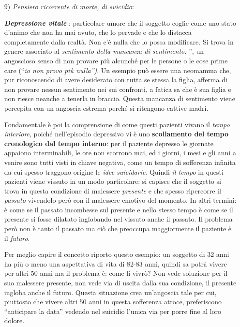\begin{itemize}
\item[9)]
\emph{Pensiero ricorrente di morte, di suicidio}:

\textbf{\emph{Depressione vitale}} : particolare umore che il soggetto
coglie come uno stato d'animo che non ha mai avuto, che lo pervade e che
lo distacca completamente dalla realtà. Non c'è nulla che lo possa
modificare. Si trova in genere associato al \emph{sentimento della
mancanza di sentimento:} '', un angoscioso senso di non provare più
alcunché per le persone o le cose prime care (``\emph{io non provo più
nulla'')}. Un esempio può essere una neomamma che, pur riconoscendo di
avere desiderato con tutta se stessa la figlia, afferma di non provare
nessun sentimento nei sui confronti, a fatica sa che è sua figlia e non
riesce neanche a tenerla in braccio. Questa mancanza di sentimento viene
percepita con un angoscia estrema perché si ritengono cattive madri.

Fondamentale è poi la comprensione di come questi pazienti vivano il
\emph{tempo interiore}, poiché nell'episodio depressivo vi è uno
\textbf{scollamento del tempo cronologico dal tempo interno}: per il
paziente depresso le giornate appaiono interminabili, le ore non
scorrono mai, ed i giorni, i mesi e gli anni a venire sono tutti visti
in chiave negativa, come un tempo di sofferenza infinita da cui spesso
traggono origine le \emph{idee suicidarie}. Quindi \emph{il tempo} in
questi pazienti viene vissuto in un modo particolare: si capisce che il
soggetto si trova in questa condizione di malessere \emph{presente} e
che spesso ripercorre il \emph{passato} vivendolo però con il malessere
emotivo del momento. In altri termini: è come se il passato incombesse
sul presente e nello stesso tempo è come se il presente si fosse
dilatato inglobando nel vissuto anche il passato. Il problema però non è
tanto il passato ma ciò che preoccupa maggiormente il paziente è il
\emph{futuro}.

Per meglio capire il concetto riporto questo esempio: un soggetto di 32
anni ha più o meno una aspettativa di vita di 82-83 anni, quindi sa
potrà vivere per altri 50 anni ma il problema è: come li vivrò? Non vede
soluzione per il suo malessere presente, non vede via di uscita dalla
sua condizione, il presente ingloba anche il futuro. Questa situazione
crea un'angoscia tale per cui, piuttosto che vivere altri 50 anni in
questa sofferenza atroce, preferiscono ``anticipare la data'' vedendo
nel suicidio l'unica via per porre fine al loro dolore.
\end{itemize}

